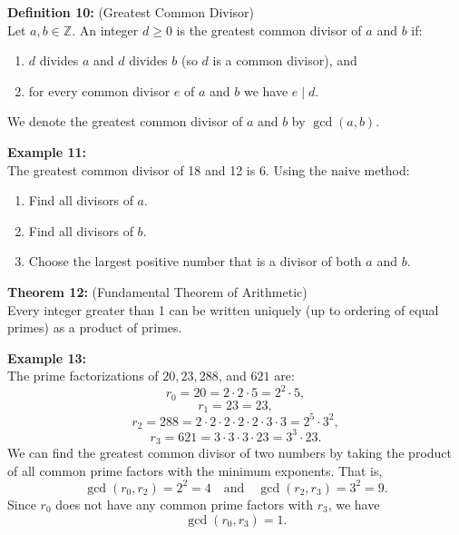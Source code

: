 \documentclass[12pt]{article}
\begin{document}
\vspace{5mm}

\noindent\textbf{Definition 10:} (Greatest Common Divisor)
\label{def:gcd}
\\Let $a,b \in \mathbb{Z}$. An integer $d\ge 0$ is the greatest common divisor of $a$ and $b$ if:
\begin{enumerate}
    \item $d$ divides $a$ and $d$ divides $b$ (so $d$ is a common divisor), and
    \item for every common divisor $e$ of $a$ and $b$ we have $e \mid d$.
\end{enumerate}
We denote the greatest common divisor of $a$ and $b$ by $\gcd(a,b)$.

\vspace{5mm}

\noindent\textbf{Example 11:}
\label{ex:gcdnaive}
\\The greatest common divisor of 18 and 12 is 6. Using the naive method: 
\begin{enumerate}
    \item Find all divisors of $a$.
    \item Find all divisors of $b$.
    \item Choose the largest positive number that is a divisor of both $a$ and $b$.
\end{enumerate}

\vspace{5mm}

\noindent\textbf{Theorem 12:} (Fundamental Theorem of Arithmetic)
\label{thm:fta}
\\Every integer greater than 1 can be written uniquely (up to ordering of equal primes) as a product of primes.

\vspace{5mm}

\noindent\textbf{Example 13:}
\label{ex:primefact}
\\The prime factorizations of $20, 23, 288$, and $621$ are:
\[
r_0 = 20 = 2 \cdot 2 \cdot 5 = 2^2 \cdot 5,
\]
\[
r_1 = 23 = 23,
\]
\[
r_2 = 288 = 2 \cdot 2 \cdot 2 \cdot 2 \cdot 2 \cdot 3 \cdot 3 = 2^5 \cdot 3^2,
\]
\[
r_3 = 621 = 3 \cdot 3 \cdot 3 \cdot 23 = 3^3 \cdot 23.
\]
We can find the greatest common divisor of two numbers by taking the product of all common prime factors with the minimum exponents. That is, 
\[
\gcd(r_0, r_2) = 2^2 = 4 \quad \text{and} \quad \gcd(r_2, r_3) = 3^2 = 9.
\]
Since \(r_0\) does not have any common prime factors with \(r_3\), we have
\[
\gcd(r_0, r_3) = 1.
\]
\end{document}
